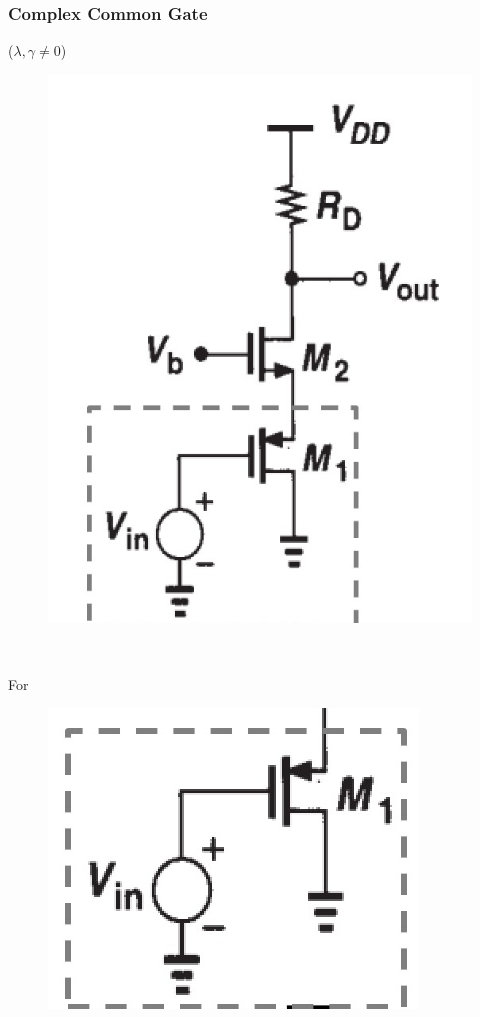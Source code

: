 \documentclass{beamer}
\begin{document}
\begin{frame}
    \frametitle{Complex Common Gate}
    \begin{minipage}{0.4\linewidth}
       ($\lambda, \gamma\not= 0$)
        \begin{figure}[H]
            \centering
            \includegraphics[width=0.8\linewidth]{common-gate2.png}
        \end{figure}
    \end{minipage}
    \,
    \begin{minipage}{0.55\linewidth}
        For
        \begin{minipage}{0.26\linewidth}
            \begin{figure}[H]
                \includegraphics[width=1.1\linewidth]{source-follower2.png}

\end{figure}
\end{minipage}
\end{minipage}
\end{frame}
\end{document}
